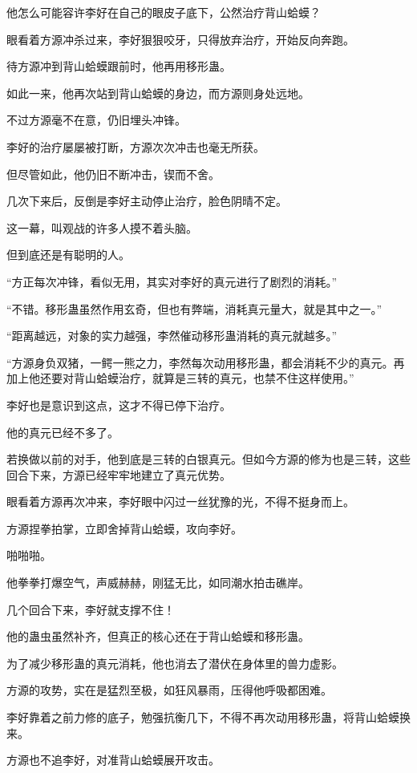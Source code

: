 \begin{this_body}
他怎么可能容许李好在自己的眼皮子底下，公然治疗背山蛤蟆？

眼看着方源冲杀过来，李好狠狠咬牙，只得放弃治疗，开始反向奔跑。

待方源冲到背山蛤蟆跟前时，他再用移形蛊。

如此一来，他再次站到背山蛤蟆的身边，而方源则身处远地。

不过方源毫不在意，仍旧埋头冲锋。

李好的治疗屡屡被打断，方源次次冲击也毫无所获。

但尽管如此，他仍旧不断冲击，锲而不舍。

几次下来后，反倒是李好主动停止治疗，脸色阴晴不定。

这一幕，叫观战的许多人摸不着头脑。

但到底还是有聪明的人。

“方正每次冲锋，看似无用，其实对李好的真元进行了剧烈的消耗。”

“不错。移形蛊虽然作用玄奇，但也有弊端，消耗真元量大，就是其中之一。”

“距离越远，对象的实力越强，李然催动移形蛊消耗的真元就越多。”

“方源身负双猪，一鳄一熊之力，李然每次动用移形蛊，都会消耗不少的真元。再加上他还要对背山蛤蟆治疗，就算是三转的真元，也禁不住这样使用。”

李好也是意识到这点，这才不得已停下治疗。

他的真元已经不多了。

若换做以前的对手，他到底是三转的白银真元。但如今方源的修为也是三转，这些回合下来，方源已经牢牢地建立了真元优势。

眼看着方源再次冲来，李好眼中闪过一丝犹豫的光，不得不挺身而上。

方源捏拳拍掌，立即舍掉背山蛤蟆，攻向李好。

啪啪啪。

他拳拳打爆空气，声威赫赫，刚猛无比，如同潮水拍击礁岸。

几个回合下来，李好就支撑不住！

他的蛊虫虽然补齐，但真正的核心还在于背山蛤蟆和移形蛊。

为了减少移形蛊的真元消耗，他也消去了潜伏在身体里的兽力虚影。

方源的攻势，实在是猛烈至极，如狂风暴雨，压得他呼吸都困难。

李好靠着之前力修的底子，勉强抗衡几下，不得不再次动用移形蛊，将背山蛤蟆换来。

方源也不追李好，对准背山蛤蟆展开攻击。


\end{this_body}
